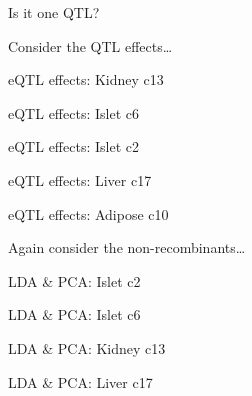 \documentclass[12pt,t]{beamer}
\begin{document}
\begin{frame}[c]{}
\centerline{\Large Is it one QTL?}
\end{frame}


\begin{frame}[c]{}
\centerline{\Large {\lolit Consider the} QTL effects{\lolit \dots}}
\end{frame}



\begin{frame}[c]{eQTL effects: Kidney c13}
\end{frame}

\begin{frame}[c]{eQTL effects: Islet c6}
\end{frame}

\begin{frame}[c]{eQTL effects: Islet c2}
\end{frame}

\begin{frame}[c]{eQTL effects: Liver c17}
\end{frame}

\begin{frame}[c]{eQTL effects: Adipose c10}
\end{frame}



\begin{frame}[c]{}
\centerline{\Large {\lolit Again consider the} non-recombinants{\lolit \dots}}
\end{frame}


\begin{frame}[c]{LDA \& PCA: Islet c2}
\end{frame}

\begin{frame}[c]{LDA \& PCA: Islet c6}
\end{frame}

\begin{frame}[c]{LDA \& PCA: Kidney c13}
\end{frame}

\begin{frame}[c]{LDA \& PCA: Liver c17}
\end{frame}
\end{document}
